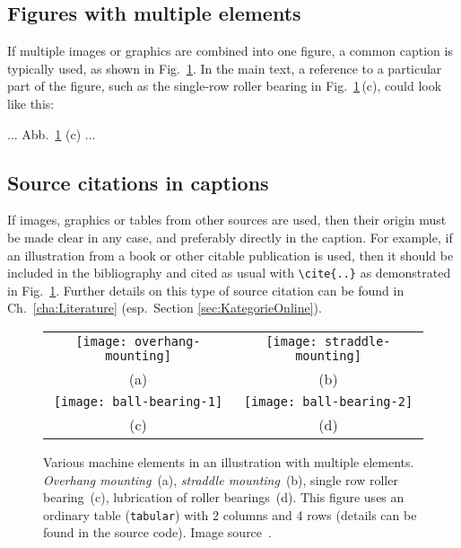 \subsection{Figures with multiple elements}

If multiple images or graphics are combined into one figure, a common caption
is typically used, as shown in Fig.~\ref{fig:Bearings}. In the main text, a
reference to a particular part of the figure, such as the single-row roller
bearing in Fig.~\ref{fig:Bearings}\,(c), could look like this:
%
\begin{LaTeXCode}[numbers=none]
    ... Abb.~\ref{fig:Bearings} (c) ...
\end{LaTeXCode}

\subsection{Source citations in captions}
\label{sec:SourceCitationsInCaptions}

If images, graphics or tables from other sources are used, then their origin
must be made clear in any case, and preferably directly in the caption. For
example, if an illustration from a book or other citable publication is used,
then it should be included in the bibliography and cited as usual with
\verb!\cite{..}! as demonstrated in Fig.\ \ref{fig:Bearings}. Further details
on this type of source citation can be found in Ch.\ \ref{cha:Literature}
(esp.\ Section \ref{sec:KategorieOnline}).

\begin{figure}
    \centering\small
    \begin{tabular}{@{}c@{\hspace{12mm}}c@{}} %
        \texttt{[image: overhang-mounting]} &
        \texttt{[image: straddle-mounting]}
        \\
        (a) & (b)
        \\[4pt]    %
        \texttt{[image: ball-bearing-1]} &
        \texttt{[image: ball-bearing-2]}
        \\
        (c) & (d)
    \end{tabular}
%
\caption{Various machine elements in an illustration with multiple elements.
\emph{Overhang mounting}~(a), \emph{straddle mounting}~(b), single row roller
bearing~(c), lubrication of roller bearings~(d). This figure uses an ordinary
table (\texttt{tabular}) with 2 columns and 4 rows (details can be found in
the source code). Image source~\cite{Faires1934}.}
\label{fig:Bearings}
\end{figure}


